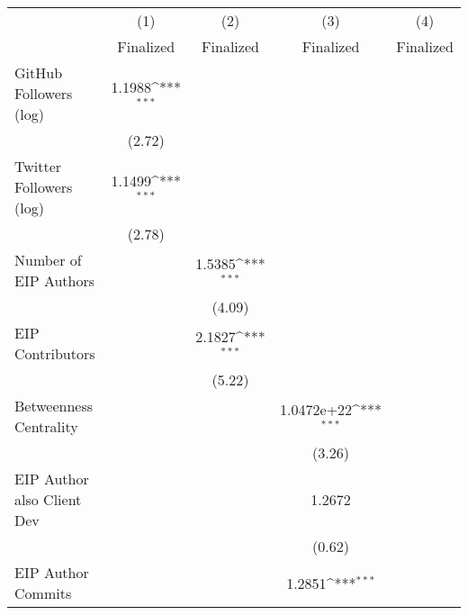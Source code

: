 {
\def\sym#1{\ifmmode^{#1}\else\(^{#1}\)\fi}
\begin{tabular}{l*{4}{c}}
\hline\hline
                                   &\multicolumn{1}{c}{(1)}         &\multicolumn{1}{c}{(2)}         &\multicolumn{1}{c}{(3)}         &\multicolumn{1}{c}{(4)}         \\
                                   &   Finalized         &   Finalized         &   Finalized         &   Finalized         \\
\hline
GitHub Followers (log)             &      1.1988\sym{***}&                     &                     &                     \\
                                   &      (2.72)         &                     &                     &                     \\
[1em]
Twitter Followers (log)            &      1.1499\sym{***}&                     &                     &                     \\
                                   &      (2.78)         &                     &                     &                     \\
[1em]
Number of EIP Authors              &                     &      1.5385\sym{***}&                     &                     \\
                                   &                     &      (4.09)         &                     &                     \\
[1em]
EIP Contributors                   &                     &      2.1827\sym{***}&                     &                     \\
                                   &                     &      (5.22)         &                     &                     \\
[1em]
Betweenness Centrality             &                     &                     &  1.0472e+22\sym{***}&                     \\
                                   &                     &                     &      (3.26)         &                     \\
[1em]
EIP Author also Client Dev         &                     &                     &      1.2672         &                     \\
                                   &                     &                     &      (0.62)         &                     \\
[1em]
EIP Author Commits                 &                     &                     &      1.2851\sym{***}&                     \\

\end{tabular}}
